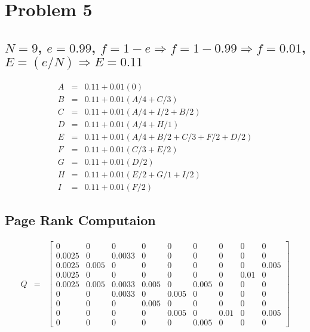 \documentclass{article}
\begin{document}
\section[E]{Problem 5}
\subsection{$N = 9$, $e = 0.99$, $f = 1 - e \Rightarrow f = 1 - 0.99 \Rightarrow f = 0.01$, $E = (e/N) \Rightarrow E = 0.11$}
\[
\begin{array}{rcl}A & = & 0.11 + 0.01(0)\\ B & = & 0.11 + 0.01(A/4 + C/3) \\ C & = & 0.11 + 0.01(A/4 + I/2 + B/2) \\ D & = & 0.11 + 0.01(A/4 + H/1) \\ E & = &0.11 + 0.01(A/4+B/2 + C/3 + F/2 + D/2) \\ F & = & 0.11 + 0.01(C/3 + E/2) \\ G & = & 0.11 + 0.01(D/2) \\ H & = & 0.11 + 0.01(E/2 + G/1 + I/2) \\ I & = & 0.11 + 0.01(F/2)
\end{array}
\]
\subsection{\textbf{Page Rank Computaion}}
\[
\begin{array}{lcl}Q & = &
\begin{bmatrix} 0 & 0 & 0 & 0 & 0 & 0 & 0 & 0 & 0 \\ 0.0025 & 0 & 0.0033 & 0 & 0 & 0 & 0 & 0 & 0 \\ 0.0025 & 0.005 & 0 & 0 & 0 & 0 & 0 & 0 & 0.005 \\ 0.0025 & 0 & 0 & 0 & 0& 0 & 0 & 0.01 & 0 \\ 0.0025 & 0.005 & 0.0033 & 0.005 & 0 & 0.005 & 0 & 0 & 0 \\ 0 & 0 & 0.0033 & 0 & 0.005 & 0 & 0 & 0 & 0 \\ 0 & 0 & 0 & 0.005 & 0 & 0 & 0 & 0 & 0 \\ 0 & 0 & 0 & 0 & 0.005 & 0 & 0.01 & 0 & 0.005 \\ 0 & 0 & 0 & 0 & 0 & 0.005 & 0 & 0 & 0
\end{bmatrix}
\end{array}
\]
\end{document}
